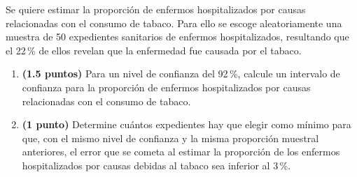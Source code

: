 
Se quiere estimar la proporción de enfermos hospitalizados por causas relacionadas con el consumo de tabaco. Para ello se escoge aleatoriamente una muestra de 50 expedientes sanitarios de enfermos hospitalizados, resultando que el 22\,\% de ellos revelan que la enfermedad fue causada por el tabaco.
\begin{enumerate}[label=\alph*),leftmargin=2.4em]
  \item \textbf{(1.5 puntos)} Para un nivel de confianza del 92\,\%, calcule un intervalo de confianza para la proporción de enfermos hospitalizados por causas relacionadas con el consumo de tabaco.
  \item \textbf{(1 punto)} Determine cuántos expedientes hay que elegir como mínimo para que, con el mismo nivel de confianza y la misma proporción muestral anteriores, el error que se cometa al estimar la proporción de los enfermos hospitalizados por causas debidas al tabaco sea inferior al 3\,\%.
\end{enumerate}

